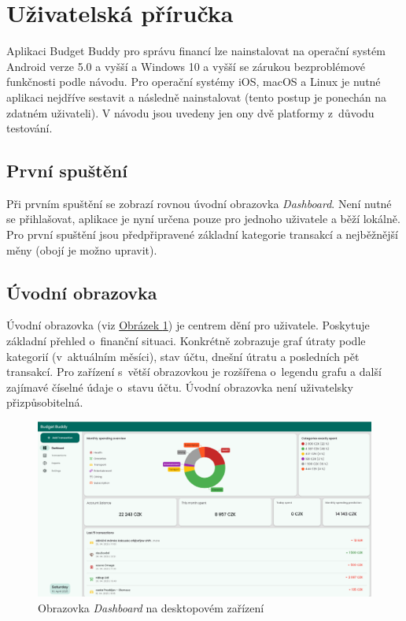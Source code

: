 \documentclass[
  biblatex,
  figures=true,
  tables=false,
  glossaries,
  index
]{kidiplom}
\begin{document}
\section{Uživatelská příručka}
Aplikaci Budget Buddy pro správu financí lze nainstalovat na operační systém Android verze 5.0 a vyšší a Windows 10 a vyšší se zárukou bezproblémové funkčnosti podle návodu. Pro operační systémy iOS, macOS a Linux je nutné aplikaci nejdříve sestavit a následně nainstalovat (tento postup je ponechán na zdatném uživateli). V návodu jsou uvedeny jen ony dvě platformy z~důvodu testování. 

\subsection{První spuštění}
Při prvním spuštění se zobrazí rovnou úvodní obrazovka \textit{Dashboard}. Není nutné se přihlašovat, aplikace je nyní určena pouze pro jednoho uživatele a běží lokálně. Pro první spuštění jsou předpřipravené základní kategorie transakcí a nejběžnější měny (obojí je možno upravit). 

\subsection{Úvodní obrazovka}
Úvodní obrazovka (viz \hyperref[fig:dashboard-large]{Obrázek \ref{fig:dashboard-large}}) je centrem dění pro uživatele. Poskytuje základní přehled o~finanční situaci. Konkrétně zobrazuje graf útraty podle kategorií (v~aktuálním měsíci), stav účtu, dnešní útratu a posledních pět transakcí. Pro zařízení s~větší obrazovkou je rozšířena o~legendu grafu a další zajímavé číselné údaje o~stavu účtu. Úvodní obrazovka není uživatelsky přizpůsobitelná.

\begin{figure}
  \centering
  \includegraphics[width=\textwidth]{images/dashboard-large.png}
  \caption{Obrazovka \textit{Dashboard} na desktopovém zařízení}
  \label{fig:dashboard-large}
\end{figure}
\end{document}
